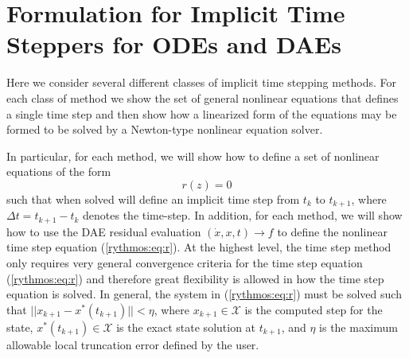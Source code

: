 \cleardoublepage{}

\section{Formulation for Implicit Time Steppers for ODEs and DAEs}

\label{rythmos:sec:implicit-time-steppers}

Here we consider several different classes of implicit time stepping
methods. For each class of method we show the set of general nonlinear
equations that defines a single time step and then show how a linearized
form of the equations may be formed to be solved by a Newton-type
nonlinear equation solver.

In particular, for each method, we will show how to define a set of
nonlinear equations of the form 
\begin{equation}
r(z)=0\label{rythmos:eq:r}
\end{equation}
such that when solved will define an implicit time step from $t_{k}$
to $t_{k+1}$, where $\Delta t=t_{k+1}-t_{k}$ denotes the time-step.
In addition, for each method, we will show how to use the DAE residual
evaluation $(\dot{x},x,t){}\rightarrow f$ to define the nonlinear
time step equation (\ref{rythmos:eq:r}). At the highest level, the
time step method only requires very general convergence criteria for
the time step equation (\ref{rythmos:eq:r}) and therefore great flexibility
is allowed in how the time step equation is solved. In general, the
system in (\ref{rythmos:eq:r}) must be solved such that $||x_{k+1}-x^{*}(t_{k+1})||<\eta$,
where $x_{k+1}\in\mathcal{X}$ is the computed step for the state,
$x^{*}(t_{k+1})\in\mathcal{X}$ is the exact state solution at $t_{k+1}$,
and $\eta$ is the maximum allowable local truncation error defined
by the user.

